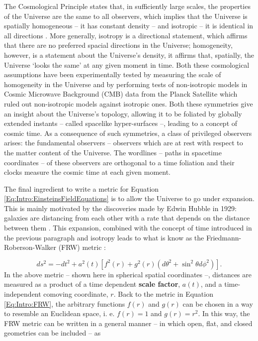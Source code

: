 \qquad The Cosmological Principle states that, in sufficiently large scales, the properties of the Universe are the same to all observers, which implies that the Universe is spatially homogeneous -- it has constant density  -- and isotropic -- it is identical in all directions \citep{keel2002road}.  More generally, isotropy is a directional statement, which affirms that there are no preferred spacial directions in the Universe; homogeneity, however, is a statement about the Universe's density, it affirms that, spatially, the Universe `looks the same' at any given moment in time. Both these cosmological assumptions have been experimentally tested by measuring the scale of homogeneity in the Universe \citep{1999NaturWu} and by performing tests of non-isotropic models in Cosmic Microwave Background (CMB) data from the Planck Satellite \citep{2016PhRvLSaadeh} which ruled out non-isotropic models against isotropic ones. Both these symmetries give an insight about the Universe's topology, allowing it to be foliated by globally extended instants -- called spacelike hyper-surfaces --, leading to a concept of cosmic time. As a consequence of such symmetries, a class of privileged observers arises: the fundamental observers -- observers which are at rest with respect to the matter content of the Universe. The wordlines -- paths in spacetime coordinates -- of these observers are orthogonal to a time foliation and their clocks measure the cosmic time at each given moment. 

\qquad The final ingredient to write a metric for Equation \eqref{Eq:Intro:EinsteinsFieldEquations} is to allow the Universe to go under expansion. This is mainly motivated by the discoveries made by Edwin Hubble in 1929: galaxies are distancing from each other with a rate that depends on the distance between them \citep{1929Hubble}. This expansion, combined with the concept of time introduced in the previous paragraph and isotropy leads to what is know as the Friedmann-Roberson-Walker (FRW) metric \citep{1922Friedmann,Peacock,dods}:


\begin{equation}
ds^2 = -dt^2 + a^2(t)\left[f^2(r) + g^2(r)\left(d\theta^2 + \sin^2\theta d\phi^2\right)\right].
\label{Eq:Intro:FRW}
\end{equation}
In the above metric -- shown here in spherical spatial coordinates --, distances are measured as a product of a time dependent \textbf{scale factor}, $a(t)$, and a time-independent comoving coordinate, $r$. Back to the metric in Equation \eqref{Eq:Intro:FRW}, the arbitrary functions $f(r)$ and $g(r)$ can be chosen in a way to resemble an Euclidean space, i. e. $f(r) = 1$ and $g(r) = r^2$. In this way, the FRW metric can be written in a general manner -- in which open, flat, and closed geometries can be included -- as 

